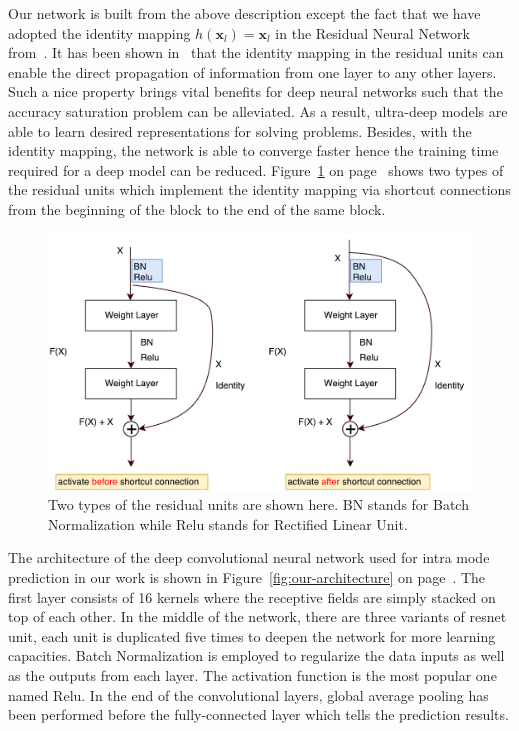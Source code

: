 Our network is built from the above description except the 
fact that we have adopted the identity mapping 
\(h(\mathbf{x}_l)=\mathbf{x}_l\) in the Residual 
Neural Network from~\parencite{RN67}.
It has been shown in~\parencite{RN68} that
the identity mapping in the residual units
can enable the direct propagation of information
from one layer to any other layers.
Such a nice property brings vital benefits
for deep neural networks such that the accuracy
saturation problem can be alleviated.
As a result, ultra-deep models are able to
learn desired representations for solving
problems.
Besides, with the identity mapping, the network
is able to converge faster hence the training time
required for a deep model can be reduced.
Figure~\ref{fig:basic-resnet-structure} on 
page~\pageref{fig:basic-resnet-structure}
shows two types
of the residual units which implement the identity mapping
via shortcut connections from the beginning of the block
to the end of the same block.
\begin{figure}
    \centering
    \includegraphics[width=\textwidth,height=\textheight,keepaspectratio]{Figures/basic-resnet-structure.pdf}
    \caption[Two types of the residual units]{
        Two types of the residual units are shown here.
        BN stands for Batch Normalization while
        Relu stands for Rectified Linear Unit.
        }\label{fig:basic-resnet-structure}
\end{figure}

The architecture of the deep convolutional neural 
network used for intra mode prediction in our work
is shown in Figure~\ref{fig:our-architecture} on
page~\pageref{fig:our-architecture}.
The first layer consists of 16 kernels where
the receptive fields are 
simply stacked on top of each other.
In the middle of the network, there are
three variants of resnet unit, each unit
is duplicated five times to deepen the network
for more learning capacities.
Batch Normalization is employed to regularize
the data inputs as well as the outputs from each layer.
The activation function is the most popular one named Relu.
In the end of the convolutional layers, global average pooling
has been performed before the fully-connected layer which 
tells the prediction results.


